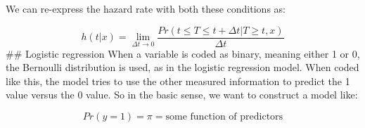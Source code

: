 \documentclass[
]{article}
\begin{document}
We can re-express the hazard rate with both these conditions as:

\[h(t|x) = \lim_{\Delta t \rightarrow 0} \frac{Pr(t \leqslant T \leqslant t + \Delta t | T \geqslant t, x)}{\Delta t}\]
\#\# Logistic regression
When a variable is coded as binary, meaning either 1 or 0, the Bernoulli distribution is used, as in the logistic regression model. When coded like this, the model tries to use the other measured information to predict the 1 value versus the 0 value. So in the basic sense, we want to construct a model like:

\[Pr(y=1) =\pi =  \text{some function of predictors}\]

  
\end{document}
